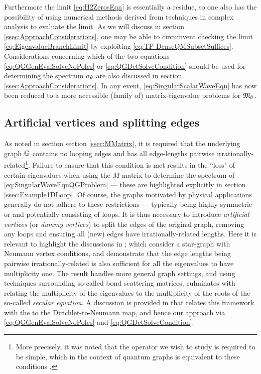 Furthermore the limit \eqref{eq:H2ZerosEqn} is essentially a residue, so one also has the possibility of using numerical methods derived from techniques in complex analysis to evaluate the limit.
As we will discuss in section \ref{ssec:ApproachConsiderations}, one may be able to circumvent checking the limit \eqref{eq:EigenvalueBranchLimit} by exploiting \eqref{eq:TP-DenseQMSubsetSuffices}.
Considerations concerning which of the two equations \eqref{eq:QGGenEvalSolveNoPoles} or \eqref{eq:QGDetSolveCondition} should be used for determining the spectrum $\sigma_\theta$ are also discussed in section \ref{ssec:ApproachConsiderations}.
In any event, \eqref{eq:SingularScalarWaveEqn} has now been reduced to a more accessible (family of) matrix-eigenvalue problems for $\mathfrak{M}_\theta$.

\subsection{Artificial vertices and splitting edges} \label{ssec:ArtificialVertices}
As noted in section section \ref{ssec:MMatrix}, it is required that the underlying graph $\mathbb{G}$ contains no looping edges and has all edge-lengths pairwise irrationally-related\footnote{More precisely, it was noted that the operator we wish to study is required to be simple, which in the context of quantum graphs is equivalent to these conditions \cite{ashurova2014simplicity}.}.
Failure to ensure that this condition is met results in the ``loss" of certain eigenvalues when using the $M$-matrix to determine the spectrum of \eqref{eq:SingularWaveEqnQGProblem} --- these are highlighted explicitly in section \ref{ssec:Example1DLoop}.
Of course, the graphs motivated by physical applications generally do not adhere to these restrictions --- typically being highly symmetric or and potentially consisting of loops.
It is thus necessary to introduce \emph{artificial vertices} (or \emph{dummy vertices}) to split the edges of the original graph, removing any loops and ensuring all (new) edges have irrationally-related lengths.
Here it is relevant to highlight the discussions in \cite[examples 1.4.3 and 2.1.12]{berkolaiko2013introduction}; which consider a star-graph with Neumann vertex conditions, and demonstrate that the edge lengths being pairwise irrationally-related is also sufficient for all the eigenvalues to have multiplicity one.
The result \cite[theorem 3.7.1]{berkolaiko2013introduction} handles more general graph settings, and using techniques surrounding so-called bond scattering matrices, culminates with \cite[theorem 3.7.1]{berkolaiko2013introduction} relating the multiplicity of the eigenvalues to the multiplicity of the roots of the so-called \emph{secular equation}.
A discussion is provided in \cite[section 3.5]{berkolaiko2013introduction} that relates this framework with the to the Dirichlet-to-Neumann map, and hence our approach via \eqref{eq:QGGenEvalSolveNoPoles} and \eqref{eq:QGDetSolveCondition}.

